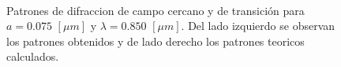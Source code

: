 \documentclass[11pt,letterpaper,twocolumn]{article}
\begin{document}
\begin{figure}[h!]
\begin{center}
\\
\caption{Patrones de difraccion de campo cercano y de transición para $a=0.075$ $[\mu m]$ y $\lambda=0.850$ $[\mu m]$. Del lado izquierdo se observan los patrones obtenidos y de lado derecho los patrones teoricos calculados.}
\end{center}
\label{pos}
\end{figure}
\end{document}

